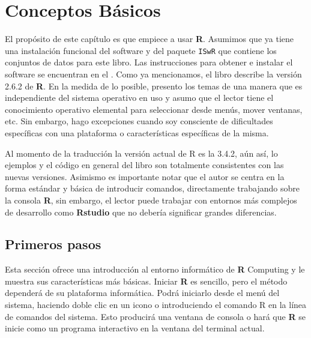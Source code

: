 \chapter{Conceptos Básicos}

El propósito de este capítulo es que empiece a usar  \textbf{R}. Asumimos que
ya tiene una instalación funcional del software y del paquete \texttt{ISwR} que
contiene los conjuntos de datos para este libro. Las instrucciones para obtener
e instalar el software se encuentran en el . Como ya
mencionamos, el libro describe la versión 2.6.2 de  \textbf{R}.  En la medida
de lo posible, presento los temas de una manera que es independiente del
sistema operativo en uso y asumo que el lector tiene el conocimiento operativo
elemental para seleccionar desde menús, mover ventanas, etc. Sin embargo, hago
excepciones cuando soy consciente de dificultades específicas con una
plataforma o características específicas de la misma.

\begin{tradnote}
	Al momento de la traducción la versión actual de R es la
	3.4.2, aún así, lo ejemplos y el código en general del libro son totalmente
	consistentes con las nuevas versiones. Asimismo es importante notar que el
	autor se centra en la forma estándar y básica de introducir comandos,
	directamente trabajando sobre la consola \textbf{R}, sin embargo, el lector
	puede trabajar con entornos más complejos de desarrollo como
	\textbf{Rstudio} que no debería significar grandes diferencias.
\end{tradnote}

\section{Primeros pasos}

Esta sección ofrece una introducción al entorno informático de  \textbf{R}
Computing y le muestra sus características más básicas. Iniciar  \textbf{R} es
sencillo, pero el método dependerá de su plataforma informática.  Podrá
iniciarlo desde el menú del sistema, haciendo doble clic en un icono o
introduciendo el comando \textquotedbl{}R\textquotedbl{} en la línea de
comandos del sistema. Esto producirá una ventana de consola o hará que
\textbf{R} se inicie como un programa interactivo en la ventana del terminal
actual.


